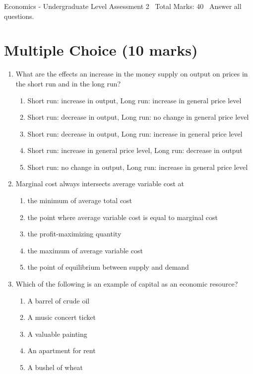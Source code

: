 \documentclass[12pt]{article}
\begin{document}
\begin{center}
Economics - Undergraduate Level Assessment 2 \
Total Marks: 40 \
Answer all questions.
\end{center}

\section*{Multiple Choice (10 marks)}
\begin{enumerate}[label=\arabic*.]
\item What are the effects an increase in the money supply on output on prices in the short run
and in the long run?
\begin{enumerate}[label=(\alph*)]
    \item Short run: increase in output, Long run: increase in general price level
    \item Short run: decrease in output, Long run: no change in general price level
    \item Short run: decrease in output, Long run: increase in general price level
    \item Short run: increase in general price level, Long run: decrease in output
    \item Short run: no change in output, Long run: increase in general price level
\end{enumerate}
\item Marginal cost always intersects average variable cost at
\begin{enumerate}[label=(\alph*)]
    \item the minimum of average total cost
    \item the point where average variable cost is equal to marginal cost
    \item the profit-maximizing quantity
    \item the maximum of average variable cost
    \item the point of equilibrium between supply and demand
\end{enumerate}
\item Which of the following is an example of capital as an economic resource?
\begin{enumerate}[label=(\alph*)]
    \item A barrel of crude oil
    \item A music concert ticket
    \item A valuable painting
    \item An apartment for rent
    \item A bushel of wheat

\end{enumerate}
\end{enumerate}
\end{document}

